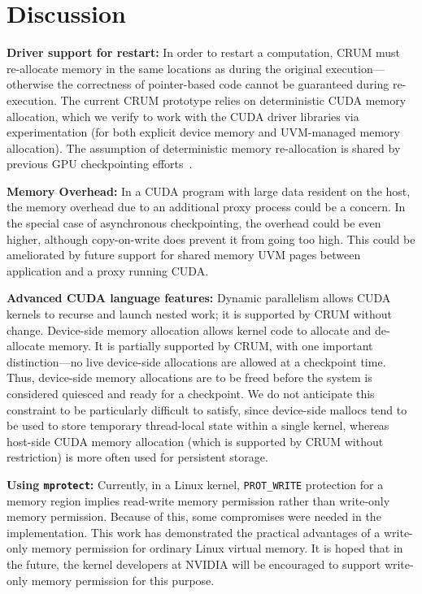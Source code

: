 \documentclass[11pt]{article}
\begin{document}
\section{Discussion}
\label{sec:discussion}

{\bf Driver support for restart:} In order to restart a computation, CRUM must
re-allocate memory in the same locations as during the original
execution---otherwise the correctness of pointer-based code cannot be
guaranteed during re-execution. The current CRUM prototype relies on
deterministic CUDA memory allocation, which we verify to work with the CUDA
driver libraries via experimentation (for both explicit device memory and
UVM-managed memory allocation). The assumption of deterministic memory
re-allocation is shared by previous GPU checkpointing
efforts~\cite{nukada2011nvcr}.

{\bf Memory Overhead:} In a CUDA program with large
data resident on the host, the memory overhead due to an additional
proxy process could be a concern.  In the special case of asynchronous
checkpointing, the overhead could be even higher, although copy-on-write
does prevent it from going too high. This could be ameliorated by future
support for shared memory UVM pages between application and a proxy
running CUDA.

{\bf Advanced CUDA language features:} Dynamic parallelism allows CUDA kernels
to recurse and launch nested work; it is supported by CRUM without change.
Device-side memory allocation allows kernel code to allocate and de-allocate
memory. It is partially supported by CRUM, with one important distinction---no
live device-side allocations are allowed at a checkpoint time.  Thus,
device-side memory allocations are to be freed before the system is considered
quiesced and ready for a checkpoint. We do not anticipate this constraint to be
particularly difficult to satisfy, since device-side mallocs tend to be used to
store temporary thread-local state within a single kernel, whereas host-side
CUDA memory allocation (which is supported by CRUM without restriction) is more often used for persistent storage.

\textbf{Using \texttt{mprotect}:} Currently, in a Linux kernel, {\tt PROT\_WRITE}
protection for a memory region implies read-write memory permission rather than
write-only memory permission.  Because of this, some compromises were needed in
the implementation.  This work has demonstrated the practical advantages of a
write-only memory permission for ordinary Linux virtual memory.  It is hoped
that in the future, the kernel developers at NVIDIA will be encouraged to
support write-only memory permission for this purpose.
\end{document}
